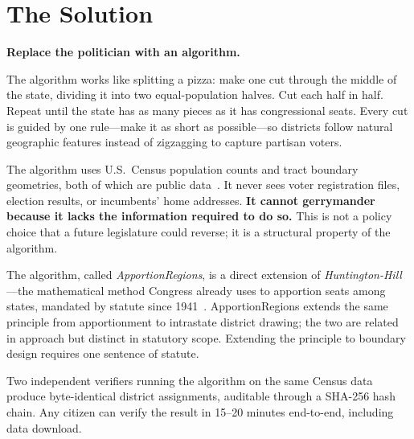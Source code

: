 
\section{The Solution}

\noindent\textbf{Replace the politician with an algorithm.}

\medskip
\noindent
The algorithm works like splitting a pizza: make one cut through the
middle of the state, dividing it into two equal-population halves.
Cut each half in half.
Repeat until the state has as many pieces as it has congressional seats.
Every cut is guided by one rule---make it as short as possible---so
districts follow natural geographic features instead of zigzagging to
capture partisan voters.

\medskip
\noindent
The algorithm uses U.S.\ Census population counts and tract boundary
geometries, both of which are public data~\cite{census2020pl}.
It never sees voter registration files, election results, or incumbents'
home addresses.
\textbf{It cannot gerrymander because it lacks the information
required to do so.}
This is not a policy choice that a future legislature could reverse;
it is a structural property of the algorithm.

\medskip
\noindent
The algorithm, called \textit{ApportionRegions}, is a direct extension of
\textit{Huntington-Hill}---the mathematical method Congress already uses to
apportion seats among states, mandated by statute since
1941~\cite{huntingtonHill1941}.
ApportionRegions extends the same principle from apportionment to intrastate
district drawing; the two are related in approach but distinct in statutory
scope.
Extending the principle to boundary design requires one sentence of statute.

\medskip
\noindent
Two independent verifiers running the algorithm on the same Census data
produce byte-identical district assignments, auditable through a
SHA-256 hash chain.
Any citizen can verify the result in 15--20 minutes end-to-end,
including data download.
